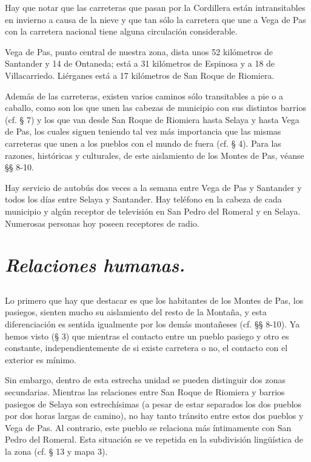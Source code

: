 Hay que notar que las carreteras que pasan por la Cordillera están intransitables en invierno a causa de la nieve y que tan sólo la carretera que une a Vega de Pas con la carretera nacional tiene alguna circulación considerable.

Vega de Pas, punto central de nuestra zona, dista unos 52 kilómetros de Santander y 14 de Ontaneda; está a 31 kilómetros de Espinosa y a 18 de Villacarriedo. Liérganes está a 17 kilómetros de San Roque de Riomiera.

Además de las carreteras, existen varios caminos sólo transitables a pie o a caballo, como son los que unen las cabezas de municipio con sus distintos barrios (cf. § 7) y los que van desde San Roque de Riomiera hasta Selaya y hasta Vega de Pas, los cuales siguen teniendo tal vez
más importancia que las mismas carreteras que unen a los pueblos con el mundo de fuera (cf. § 4). Para las razones, históricas y culturales, de este aislamiento de los Montes de Pas, véanse §§ 8-10.

Hay servicio de autobús dos veces a la semana entre Vega de Pas y Santander y todos los días entre Selaya y Santander. Hay teléfono en la cabeza de cada municipio y algún receptor de televisión en San Pedro del Romeral y en Selaya. Numerosas personas hoy poseen receptores de radio.

\section{\emph{Relaciones humanas.}}
\subsection{} Lo primero que hay que destacar es que los habitantes de los Montes de Pas, los pasiegos, sienten mucho su aislamiento del resto de la Montaña, y esta diferenciación es sentida igualmente por los demás montañeses (cf. §§ 8-10). Ya hemos visto (§ 3) que mientras el contacto entre un pueblo pasiego y otro es constante, independientemente de si existe carretera o no, el contacto con el exterior es mínimo.

Sin embargo, dentro de esta estrecha unidad se pueden distinguir dos zonas secundarias. Mientras las relaciones entre San Roque de Riomiera y barrios pasiegos de Selaya son estrechísimas (a pesar de estar separados los dos pueblos por dos horas largas de camino), no hay tanto tránsito entre estos dos pueblos y Vega de Pas. Al contrario, este pueblo se relaciona más íntimamente con San Pedro del Romeral. Esta situación se ve repetida en la subdivisión lingüística de la zona (cf. § 13 y mapa 3).

